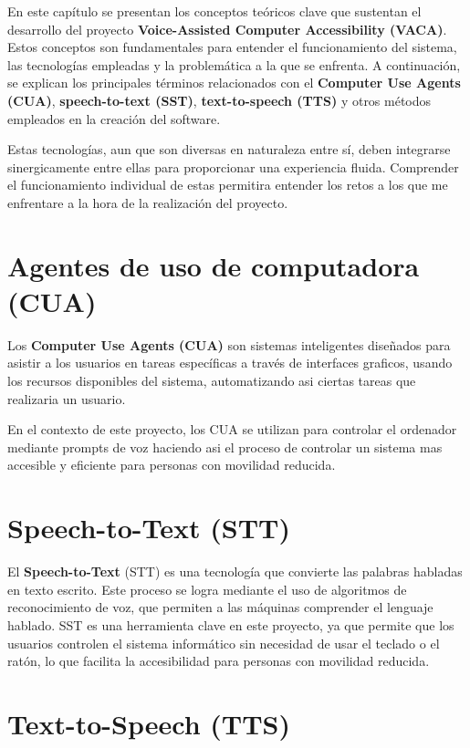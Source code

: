 
En este capítulo se presentan los conceptos teóricos clave que sustentan el desarrollo del proyecto \textbf{Voice-Assisted Computer Accessibility (VACA)}. Estos conceptos son fundamentales para entender el funcionamiento del sistema, las tecnologías empleadas y la problemática a la que se enfrenta. A continuación, se explican los principales términos relacionados con el \textbf{Computer Use Agents (CUA)}, \textbf{speech-to-text (SST)}, \textbf{text-to-speech (TTS)} y otros métodos empleados en la creación del software.

Estas tecnologías, aun que son diversas en naturaleza entre sí, deben integrarse sinergicamente entre ellas para proporcionar una experiencia fluida. Comprender el funcionamiento individual de estas permitira entender los retos a los que me enfrentare a la hora de la realización del proyecto.

\section{Agentes de uso de computadora (CUA)}

Los \textbf{Computer Use Agents (CUA)} son sistemas inteligentes diseñados para asistir a los usuarios en tareas específicas a través de interfaces graficos, usando los recursos disponibles del sistema, automatizando asi ciertas tareas que realizaria un usuario.

En el contexto de este proyecto, los CUA se utilizan para controlar el ordenador mediante prompts de voz haciendo asi el proceso de controlar un sistema mas accesible y eficiente para personas con movilidad reducida.

\section{Speech-to-Text (STT)}

El \textbf{Speech-to-Text} (STT) es una tecnología que convierte las palabras habladas en texto escrito. Este proceso se logra mediante el uso de algoritmos de reconocimiento de voz, que permiten a las máquinas comprender el lenguaje hablado. SST es una herramienta clave en este proyecto, ya que permite que los usuarios controlen el sistema informático sin necesidad de usar el teclado o el ratón, lo que facilita la accesibilidad para personas con movilidad reducida.

\section{Text-to-Speech (TTS)}


